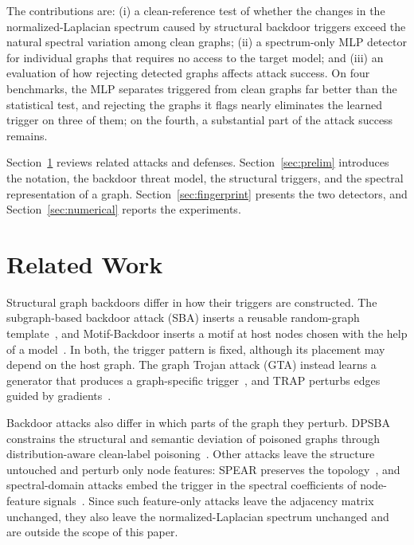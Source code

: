 \documentclass[journal]{IEEEtran}
\begin{document}
The contributions are: (i) a clean-reference test of whether the changes in the
normalized-Laplacian spectrum caused by structural backdoor triggers exceed the
natural spectral variation among clean graphs; (ii) a spectrum-only MLP
detector for individual graphs that requires no access to the target model;
and (iii) an evaluation of how rejecting detected graphs affects attack
success. On four benchmarks, the MLP separates triggered from clean graphs far
better than the statistical test, and rejecting the graphs it flags nearly
eliminates the learned trigger on three of them; on the fourth, a substantial
part of the attack success remains.

Section~\ref{sec:related} reviews related attacks and defenses.
Section~\ref{sec:prelim} introduces the notation, the backdoor threat model,
the structural triggers, and the spectral representation of a graph.
Section~\ref{sec:fingerprint} presents the two detectors, and
Section~\ref{sec:numerical} reports the experiments.

\section{Related Work}\label{sec:related}
Structural graph backdoors differ in how their triggers are constructed. The
subgraph-based backdoor attack (SBA) inserts a reusable random-graph
template~\cite{sba2021}, and Motif-Backdoor inserts a motif at host nodes
chosen with the help of a model~\cite{motif}. In both, the trigger pattern is
fixed, although its placement may depend on the host graph. The graph Trojan
attack (GTA) instead learns a generator that produces a graph-specific
trigger~\cite{gta2021}, and TRAP perturbs edges guided by
gradients~\cite{10.1145/3545948.3545976}.

Backdoor attacks also differ in which parts of the graph they perturb. DPSBA
constrains the structural and semantic deviation of poisoned graphs through
distribution-aware clean-label poisoning~\cite{dpsba2025}. Other attacks leave
the structure untouched and perturb only node features: SPEAR preserves the
topology~\cite{spear2025}, and spectral-domain attacks embed the trigger in the
spectral coefficients of node-feature signals~\cite{spectralba2024}. Since such
feature-only attacks leave the adjacency matrix unchanged, they also leave the
normalized-Laplacian spectrum unchanged and are outside the scope of this
paper.
\end{document}
